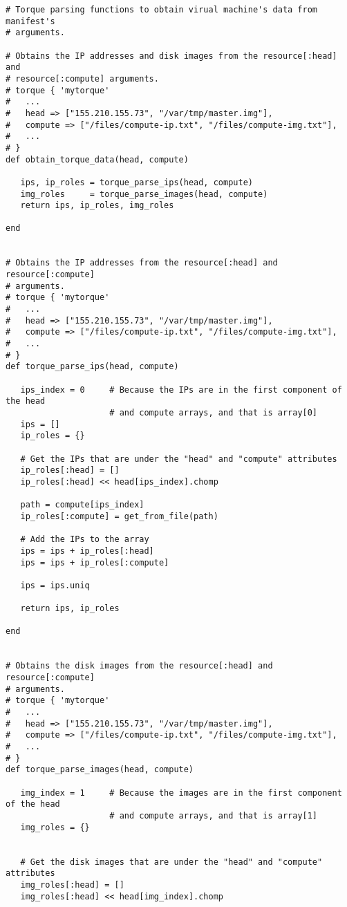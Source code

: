 \begin{lstlisting}
# Torque parsing functions to obtain virual machine's data from manifest's
# arguments.

# Obtains the IP addresses and disk images from the resource[:head] and
# resource[:compute] arguments.
# torque { 'mytorque'
#   ...
#   head => ["155.210.155.73", "/var/tmp/master.img"],
#   compute => ["/files/compute-ip.txt", "/files/compute-img.txt"],
#   ...
# }
def obtain_torque_data(head, compute)

   ips, ip_roles = torque_parse_ips(head, compute)
   img_roles     = torque_parse_images(head, compute)
   return ips, ip_roles, img_roles

end


# Obtains the IP addresses from the resource[:head] and resource[:compute]
# arguments.
# torque { 'mytorque'
#   ...
#   head => ["155.210.155.73", "/var/tmp/master.img"],
#   compute => ["/files/compute-ip.txt", "/files/compute-img.txt"],
#   ...
# }
def torque_parse_ips(head, compute)

   ips_index = 0     # Because the IPs are in the first component of the head
                     # and compute arrays, and that is array[0]
   ips = []
   ip_roles = {}
   
   # Get the IPs that are under the "head" and "compute" attributes
   ip_roles[:head] = []
   ip_roles[:head] << head[ips_index].chomp
   
   path = compute[ips_index]
   ip_roles[:compute] = get_from_file(path)
   
   # Add the IPs to the array
   ips = ips + ip_roles[:head]
   ips = ips + ip_roles[:compute]
   
   ips = ips.uniq
   
   return ips, ip_roles
   
end


# Obtains the disk images from the resource[:head] and resource[:compute]
# arguments.
# torque { 'mytorque'
#   ...
#   head => ["155.210.155.73", "/var/tmp/master.img"],
#   compute => ["/files/compute-ip.txt", "/files/compute-img.txt"],
#   ...
# }
def torque_parse_images(head, compute)

   img_index = 1     # Because the images are in the first component of the head
                     # and compute arrays, and that is array[1]
   img_roles = {}

   
   # Get the disk images that are under the "head" and "compute" attributes
   img_roles[:head] = []
   img_roles[:head] << head[img_index].chomp
   

\end{lstlisting}
